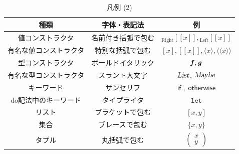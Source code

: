 \documentclass[a5paper,twoside,fleqn,draft]{jsbook}
\def\[{[\![}
\def\]{]\!]}
\def\llangle{\langle\!\langle}
\def\rrangle{\rangle\!\rangle}
\newcommand{\Langle}{\llangle}
\newcommand{\Rangle}{\rrangle}
\newcommand{\mKeyword}[1]{\mathsf{#1}}
\newcommand{\mVarKeyword}[1]{\texttt{#1}}
\newcommand{\mDoLetKeyword}{\mVarKeyword{let}}
\newcommand{\mIfKeyword}{\mKeyword{if}}
\newcommand{\mOtherwiseKeyword}{\mKeyword{otherwise}}
\DeclareMathOperator{\mIf}{\mIfKeyword}
\DeclareMathOperator{\mOtherwise}{\mOtherwiseKeyword}
\newcommand{\mPolymorphicTypeParameter}[1]{\textbf{\textit{#1}}}
\newcommand{\mTypeConstructor}[1]{\textsl{#1}}
\DeclareMathOperator{\mListTypeConstructor}{\mTypeConstructor{List}}
\DeclareMathOperator{\mMaybeTypeConstructor}{\mTypeConstructor{Maybe}}
\newcommand{\mValueConstructor}[1]{\mathrm{#1}}
\newcommand{\mValueWith}[2]{{}_\mValueConstructor{#1}\[#2\]}
\newcommand{\mLeftWith}[1]{\mValueWith{Left}{#1}}
\newcommand{\mRightWith}[1]{\mValueWith{Right}{#1}}
\newcommand{\mArrowWith}[1]{\Langle#1\Rangle}
\newcommand{\mConstWith}[1]{\langle#1\rangle}
\newcommand{\mPureWith}[1]{\[#1\]}
\newcommand{\mPairWith}[2]{\begin{pmatrix}#1\\#2\end{pmatrix}}
\begin{document}
\begin{table}[p]
\caption{凡例 (2)}
\begin{center}
\begin{tabular}{||c|c|c||}
\hline
種類&字体・表記法&例\\
\hline\hline
値コンストラクタ&名前付き括弧で包む&$\mRightWith{x},\mLeftWith{x}$\\
有名な値コンストラクタ&特別な括弧で包む&$[x],\mPureWith{x},\mConstWith{x},\mArrowWith{x}$\\
\hline
型コンストラクタ&ボールドイタリック&$\mPolymorphicTypeParameter{f},\mPolymorphicTypeParameter{g}$\\
有名な型コンストラクタ&スラント大文字&$\mListTypeConstructor$, $\mMaybeTypeConstructor$\\
\hline
キーワード&サンセリフ&$\mIf,\mOtherwise$\\
do記法中のキーワード&タイプライタ&$\mDoLetKeyword$\\
\hline
リスト&ブラケットで包む&$[x,y]$\\
集合&ブレースで包む&$\{x,y\}$\\
タプル&丸括弧で包む&$\mPairWith{x}{y}$\\
\hline
\end{tabular}
\end{center}
\end{table}
\end{document}
